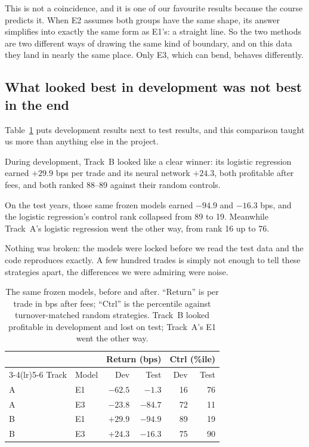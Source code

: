 \documentclass[10pt]{article}
\begin{document}
This is not a coincidence, and it is one of our favourite results because the
course predicts it. When E2 assumes both groups have the same shape, its answer
simplifies into exactly the same form as E1's: a straight line. So the two methods
are two different ways of drawing the same kind of boundary, and on this data they
land in nearly the same place. Only E3, which can bend, behaves differently.

\subsection{What looked best in development was not best in the end}

Table~\ref{tab:flip} puts development results next to test results, and this
comparison taught us more than anything else in the project.

During development, Track~B looked like a clear winner: its logistic regression
earned $+29.9$ bps per trade and its neural network $+24.3$, both profitable after
fees, and both ranked 88--89 against their random controls.

On the test years, those same frozen models earned $-94.9$ and $-16.3$ bps, and
the logistic regression's control rank collapsed from 89 to 19. Meanwhile Track~A's
logistic regression went the other way, from rank 16 up to 76.

Nothing was broken: the models were locked before we read the test data and the
code reproduces exactly. A few hundred trades is simply not enough to tell these
strategies apart, the differences we were admiring were noise.

\begin{table}[!ht]
\centering
\small
\caption{The same frozen models, before and after. ``Return'' is per trade in bps
after fees; ``Ctrl'' is the percentile against turnover-matched random
strategies. Track~B looked profitable in development and lost on test; Track~A's
E1 went the other way.}
\label{tab:flip}
\begin{tabular}{llrrrr}
\toprule
& & \multicolumn{2}{c}{Return (bps)} & \multicolumn{2}{c}{Ctrl (\%ile)} \\
\cmidrule(lr){3-4}\cmidrule(lr){5-6}
Track & Model & Dev & Test & Dev & Test \\
\midrule
A & E1 & $-62.5$ & $-1.3$ & 16 & 76 \\
A & E3 & $-23.8$ & $-84.7$ & 72 & 11 \\
B & E1 & $\mathbf{+29.9}$ & $\mathbf{-94.9}$ & 89 & 19 \\
B & E3 & $+24.3$ & $-16.3$ & 75 & 90 \\
\bottomrule
\end{tabular}
\end{table}
\end{document}
